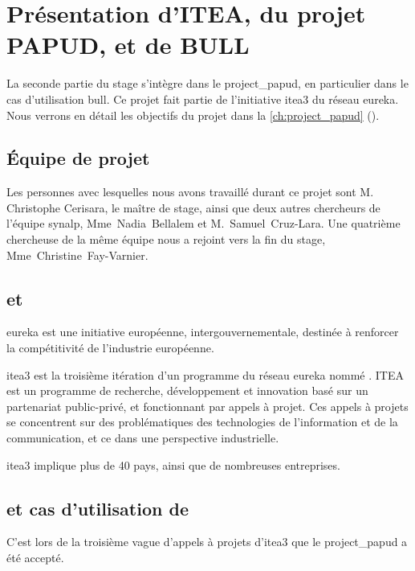 \chapter{Présentation d'ITEA, du projet PAPUD, et de BULL}
La seconde partie du stage s'intègre dans le \gls{project_papud}, en particulier dans le cas d'utilisation \gls{bull}. Ce projet fait partie de l'initiative \gls{itea3} du réseau \gls{eureka}.
%
Nous verrons en détail les objectifs du projet dans la \autoref{ch:project_papud} ().


\section{Équipe de projet}\label{sec:papud_colabo}
Les personnes avec lesquelles nous avons travaillé durant ce projet sont M. Christophe Cerisara, le maître de stage, ainsi que deux autres chercheurs de l'équipe \gls{synalp}, \mbox{Mme~Nadia~Bellalem} et \mbox{M.~Samuel~Cruz-Lara}.
Une quatrième chercheuse de la même équipe nous a rejoint vers la fin du stage, \mbox{Mme~Christine~Fay-Varnier}.

\section{ et }
\og\gls{eureka} est une initiative européenne, intergouvernementale, destinée à renforcer la compétitivité de l’industrie européenne.\fg{} \autocite{wiki_eureka}

\gls{itea3} est la troisième itération d'un programme du réseau \gls{eureka} nommé .
ITEA est un programme de recherche, développement et innovation basé sur un partenariat public-privé, et fonctionnant par appels à projet.
Ces appels à projets se concentrent sur des problématiques des technologies de l'information et de la communication, et ce dans une perspective industrielle.

\gls{itea3} implique plus de 40 pays, ainsi que de nombreuses entreprises.

\pagebreak
\section{ et cas d'utilisation de }
C'est lors de la troisième vague d'appels à projets d'\gls{itea3} que le  \gls{project_papud} a été accepté.

